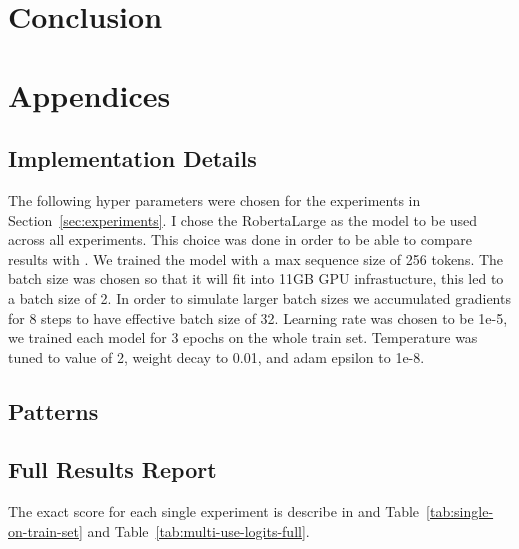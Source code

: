 \documentclass[11pt,a4paper]{article}
\begin{document}
\section{Conclusion}





\newpage
\appendix


\section{Appendices}
\label{sec:appendix}

\subsection{Implementation Details}
The following hyper parameters were chosen for the experiments in Section~\ref{sec:experiments}.
I chose the RobertaLarge as the model to be used across all experiments.
This choice was done in order to be able to compare results with \citet{schick2020exploiting}.
We trained the model with a max sequence size of 256 tokens.
The batch size was chosen so that it will fit into 11GB GPU infrastucture, this led to a batch size of 2. 
In order to simulate larger batch sizes we accumulated gradients for 8 steps to have effective batch size of 32.
Learning rate was chosen to be 1e-5, we trained each model for 3 epochs on the whole train set.
Temperature was tuned to value of 2, weight decay to 0.01, and adam epsilon to 1e-8.

\subsection{Patterns}
\label{apx:patterns}

\subsection{Full Results Report}
\label{apx:full-results-report}
The exact score for each single experiment is describe in and Table~\ref{tab:single-on-train-set} and Table~\ref{tab:multi-use-logits-full}.

%

\end{document}
